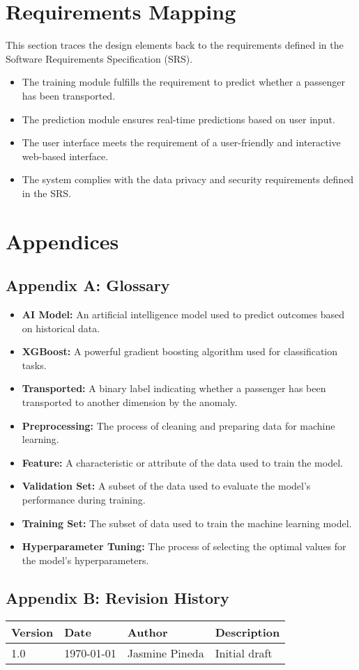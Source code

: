 \documentclass[15pt]{article}
\begin{document}
\section{Requirements Mapping}
This section traces the design elements back to the requirements defined in the Software Requirements Specification (SRS).

\begin{itemize}
    \item The training module fulfills the requirement to predict whether a passenger has been transported.
    \item The prediction module ensures real-time predictions based on user input.
    \item The user interface meets the requirement of a user-friendly and interactive web-based interface.
    \item The system complies with the data privacy and security requirements defined in the SRS.
\end{itemize}

\section{Appendices}

\subsection{Appendix A: Glossary}

\begin{itemize}
    \item \textbf{AI Model:} An artificial intelligence model used to predict outcomes based on historical data.
    \item \textbf{XGBoost:} A powerful gradient boosting algorithm used for classification tasks.
    \item \textbf{Transported:} A binary label indicating whether a passenger has been transported to another dimension by the anomaly.
    \item \textbf{Preprocessing:} The process of cleaning and preparing data for machine learning.
    \item \textbf{Feature:} A characteristic or attribute of the data used to train the model.
    \item \textbf{Validation Set:} A subset of the data used to evaluate the model's performance during training.
    \item \textbf{Training Set:} The subset of data used to train the machine learning model.
    \item \textbf{Hyperparameter Tuning:} The process of selecting the optimal values for the model's hyperparameters.
\end{itemize}
\subsection{Appendix B: Revision History}
\begin{tabular}{|l|l|l|l|}
\hline
Version & Date & Author & Description \\
\hline
1.0 & \today & Jasmine Pineda & Initial draft \\
\hline
\end{tabular}
\end{document}
